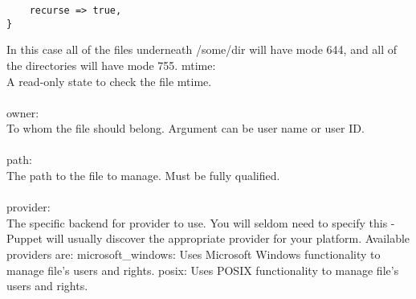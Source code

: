 {\begin{code}
\begin{lstlisting}
	recurse => true,
}
\end{lstlisting}
\end{code}
%
In this case all of the files underneath /some/dir will have mode 644, and all of the directories will have mode 755.
%
mtime:\\
A read-only state to check the file mtime.\\\\
%
owner:\\
To whom the file should belong. Argument can be user name or user ID.\\\\
%
path:\\
The path to the file to manage. Must be fully qualified.\\\\
%
provider:\\
The specific backend for provider to use. You will seldom need to specify this - Puppet will usually discover the appropriate provider for your platform. Available providers are:
%
microsoft\_windows: Uses Microsoft Windows functionality to manage file's users and rights.
posix: Uses POSIX functionality to manage file's users and rights.

}
